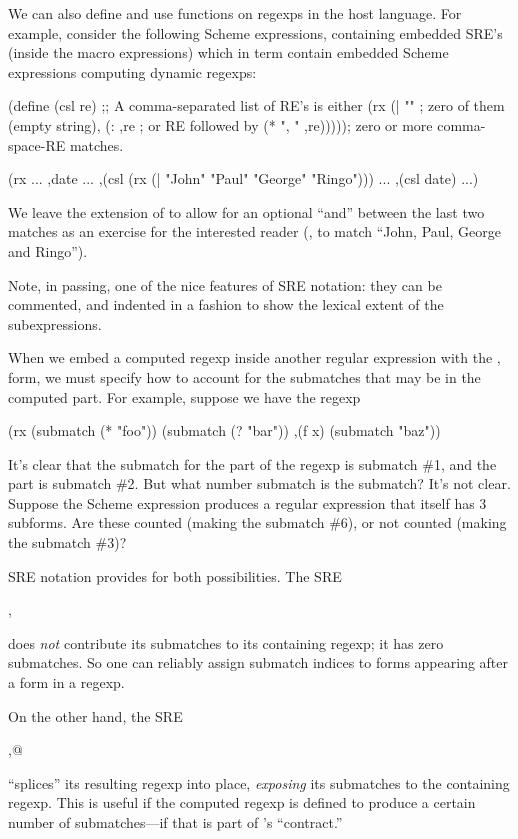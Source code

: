 We can also define and use functions on regexps in the host language. 
For example, consider the following Scheme expressions, containing
embedded SRE's (inside the  macro expressions) 
which in term contain embedded Scheme expressions computing dynamic regexps:
\begin{code}
(define (csl re)            
  ;; A comma-separated list of RE's is either
  (rx (| ""                 ; zero of them (empty string), 
         (: ,re             ; or RE followed by
            (* ", " ,re))))); zero or more comma-space-RE matches.

(rx ... ,date ...
    ,(csl (rx (| "John" "Paul" "George" "Ringo")))
    ...
    ,(csl date)
    ...)\end{code}%
%
We leave the extension of  to allow for an optional ``and'' between
the last two matches as an exercise for the interested reader (\eg, to match
``John, Paul, George and Ringo'').

Note, in passing, one of the nice features of SRE notation: they can
be commented, and indented in a fashion to show the lexical extent of
the subexpressions.

When we embed a computed regexp inside another regular expression with
the , form, we must specify how to account for the submatches that
may be in the computed part. For example, suppose we have the regexp
\begin{code}
(rx (submatch (* "foo"))
    (submatch (? "bar"))
    ,(f x)
    (submatch "baz"))\end{code}%
%
It's clear that the submatch for the  part of the regexp is
submatch \#1, and the  part is submatch \#2. But what number
submatch is the  submatch? It's not clear. Suppose the Scheme
expression  produces a regular expression that itself has 3
subforms. Are these counted (making the  submatch \#6), or not
counted (making the  submatch \#3)?

SRE notation provides for both possibilities. The SRE
\begin{code}
,\end{code}%
%
does \emph{not} contribute its submatches to its containing regexp; it
has zero submatches. So one can reliably assign submatch indices to
forms appearing after a  form in a regexp.

On the other hand, the SRE
\begin{code}
,@\end{code}%
%
``splices'' its resulting regexp into place, \emph{exposing} its submatches
to the containing regexp. This is useful if the computed regexp is defined
to produce a certain number of submatches---if that is part of 's
``contract.''


